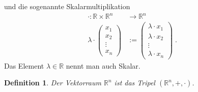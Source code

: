 \documentclass[]{article}
\newtheorem{Definition}{Definition}
\begin{document}
und die sogenannte Skalarmultiplikation 
\begin{align*}
\cdot : \mathbb{R} \times  \mathbb{R}^n   & \to \mathbb{R}^n \\
\lambda \cdot \begin{pmatrix}
x_1 \\ x_2 \\ \vdots \\ x_n
\end{pmatrix}  
&  :=  \begin{pmatrix}
\lambda  \cdot x_1  \\  \lambda \cdot x_2 \\ \vdots \\  \lambda \cdot x_n 
\end{pmatrix} \; . 
\end{align*}
Das Element $\lambda  \in \mathbb{R}$ nennt man auch Skalar.
\begin{Definition}
Der Vektorraum $\mathbb{R}^n$ ist das Tripel 
$(\mathbb{R}^n, + , \cdot )$.
\end{Definition}
\end{document}

